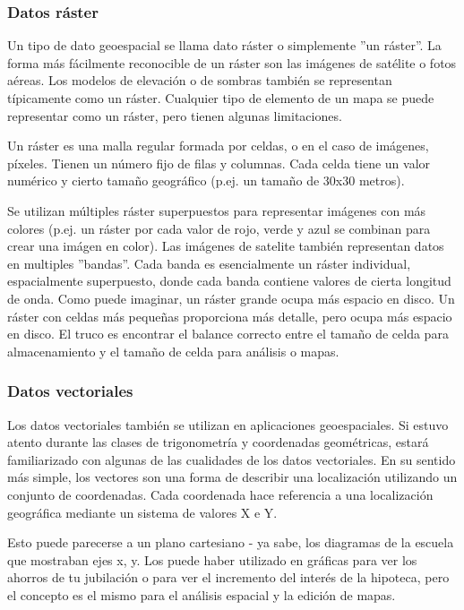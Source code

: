 \subsubsection{Datos ráster}\label{label_rasterdata}

Un tipo de dato geoespacial se llama dato ráster o simplemente ''un ráster''. 
La forma más fácilmente reconocible de un ráster son las imágenes de satélite
o fotos aéreas. Los modelos de elevación o de sombras también se representan 
típicamente como un ráster. Cualquier tipo de elemento de un mapa se puede 
representar como un ráster, pero tienen algunas limitaciones.

Un ráster es una malla regular formada por celdas, o en el caso de imágenes, 
píxeles. Tienen un número fijo de filas y columnas. Cada celda tiene un valor 
numérico y cierto tamaño geográfico (p.ej. un tamaño de 30x30 metros).

Se utilizan múltiples ráster superpuestos para representar imágenes con más 
colores (p.ej. un ráster por cada valor de rojo, verde y azul se combinan para 
crear una imágen en color). Las imágenes de satelite también representan datos 
en multiples ''bandas''. Cada banda es esencialmente un ráster individual,
espacialmente superpuesto, donde cada banda contiene valores de cierta longitud
de onda. Como puede imaginar, un ráster grande ocupa más espacio en disco. 
Un ráster con celdas más pequeñas proporciona más detalle, pero ocupa más 
espacio en disco. El truco es encontrar el balance correcto entre el tamaño 
de celda para almacenamiento y el tamaño de celda para análisis o mapas.

\subsubsection{Datos vectoriales}\label{label_vectordata}

Los datos vectoriales también se utilizan en aplicaciones geoespaciales. 
Si estuvo atento durante las clases de trigonometría y coordenadas 
geométricas, estará familiarizado con algunas de las cualidades de los datos 
vectoriales. En su sentido más simple, los vectores son una forma de describir 
una localización utilizando un conjunto de coordenadas. Cada coordenada hace 
referencia a una localización geográfica mediante un sistema de valores X e Y.

Esto puede parecerse a un plano cartesiano - ya sabe, los diagramas de la 
escuela que mostraban ejes x, y. Los puede haber utilizado en gráficas para 
ver los ahorros de tu jubilación o para ver el incremento del interés de la 
hipoteca, pero el concepto es el mismo para el análisis espacial y la edición 
de mapas.

